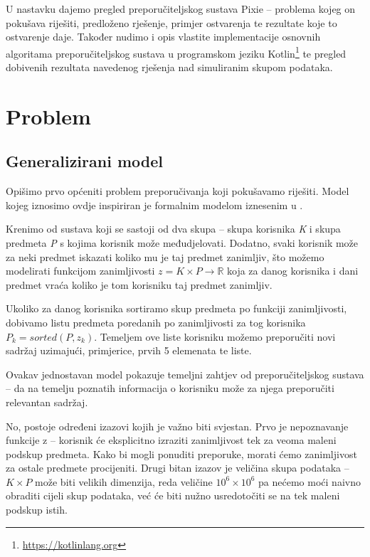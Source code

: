 \documentclass[times, utf8, seminar]{fer}
\begin{document}
U nastavku dajemo pregled preporučiteljskog sustava Pixie -- problema kojeg on pokušava riješiti, predloženo rješenje, primjer ostvarenja te rezultate koje to ostvarenje daje. Također nudimo i opis vlastite implementacije osnovnih algoritama preporučiteljskog sustava u programskom jeziku Kotlin\footnote{\url{https://kotlinlang.org}} te pregled dobivenih rezultata navedenog rješenja nad simuliranim skupom podataka.

\chapter{Problem}

\section{Generalizirani model}
Opišimo prvo općeniti problem preporučivanja koji pokušavamo riješiti. Model kojeg iznosimo ovdje inspiriran je formalnim modelom iznesenim u \cite{avsp-recommender}.

Krenimo od sustava koji se sastoji od dva skupa -- skupa korisnika \textit{K} i skupa predmeta \textit{P} s kojima korisnik može međudjelovati. Dodatno, svaki korisnik može za neki predmet iskazati koliko mu je taj predmet zanimljiv, što možemo modelirati funkcijom zanimljivosti $z = K \times P \to \mathbb{R}$ koja za danog korisnika i dani predmet vraća koliko je tom korisniku taj predmet zanimljiv.

Ukoliko za danog korisnika sortiramo skup predmeta po funkciji zanimljivosti, dobivamo listu predmeta poredanih po zanimljivosti za tog korisnika $P_k = sorted(P, z_k)$. Temeljem ove liste korisniku možemo preporučiti novi sadržaj uzimajući, primjerice, prvih 5 elemenata te liste.

Ovakav jednostavan model pokazuje temeljni zahtjev od preporučiteljskog sustava -- da na temelju poznatih informacija o korisniku može za njega preporučiti relevantan sadržaj. 

No, postoje određeni izazovi kojih je važno biti svjestan. Prvo je nepoznavanje funkcije z -- korisnik će eksplicitno izraziti zanimljivost tek za veoma maleni podskup predmeta. Kako bi mogli ponuditi preporuke, morati ćemo zanimljivost za ostale predmete procijeniti. Drugi bitan izazov je veličina skupa podataka -- $K \times P$ može biti velikih dimenzija, reda veličine $10^6 \times 10^6$ pa nećemo moći naivno obraditi cijeli skup podataka, već će biti nužno usredotočiti se na tek maleni podskup istih.
\end{document}
